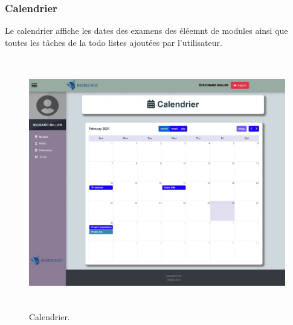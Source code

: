 \documentclass{article}
\begin{document}
{{\subsubsection{Calendrier}{Le calendrier affiche les dates des examens des éléemnt de modules ainsi que toutes les tâches de la todo listes ajoutées par l'utilisateur.
\begin{figure}[H]
    \centering
    \includegraphics[width=17cm,height=11cm]{calendrier.jpeg}
    \caption{Calendrier.}
    \label{Calendrier.}
\end{figure}

}}}
\end{document}

